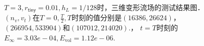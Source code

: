 \begin{figure}[htbp]
	\hfill
	\hfill
	
	\hfill
	\hfill
	
	\caption[三维剪切流场测试结果]{$T=3,r_{\mathsf{tiny}}=0.01,h_L=1/128$时，三维变形流场的测试结果图．
		$(n_v,v_t)$在$T=0, \frac{T}{2}, T$时刻的值分别是$(16386,26624)$，$(266954,533904)$和$(107012,214020).$，
		$t=T$时刻的$E_{\infty}=3.03e-04,E_{\mathrm{vol}}=1.12e-06$.}
	\label{fig:3Dflow}
\end{figure}